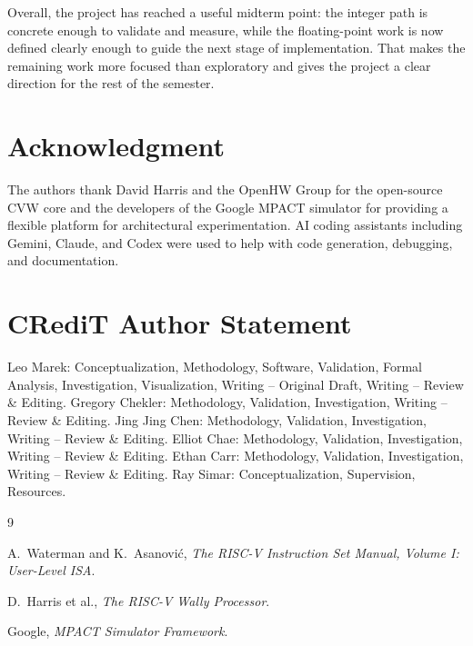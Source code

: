 \documentclass[conference,a4paper]{IEEEtran}
\begin{document}
Overall, the project has reached a useful midterm point: the integer path is concrete enough to validate and measure, while the floating-point work is now defined clearly enough to guide the next stage of implementation. That makes the remaining work more focused than exploratory and gives the project a clear direction for the rest of the semester.

\section*{Acknowledgment}

The authors thank David Harris and the OpenHW Group for the open-source CVW core and the developers of the Google MPACT simulator for providing a flexible platform for architectural experimentation. AI coding assistants including Gemini, Claude, and Codex were used to help with code generation, debugging, and documentation.

\section*{CRediT Author Statement}

Leo Marek: Conceptualization, Methodology, Software, Validation, Formal Analysis, Investigation, Visualization, Writing -- Original Draft, Writing -- Review \& Editing. Gregory Chekler: Methodology, Validation, Investigation, Writing -- Review \& Editing. Jing Jing Chen: Methodology, Validation, Investigation, Writing -- Review \& Editing. Elliot Chae: Methodology, Validation, Investigation, Writing -- Review \& Editing. Ethan Carr: Methodology, Validation, Investigation, Writing -- Review \& Editing. Ray Simar: Conceptualization, Supervision, Resources.

\begin{thebibliography}{9}

A.~Waterman and K.~Asanovi\'{c},
\emph{The RISC-V Instruction Set Manual, Volume I: User-Level ISA}.

D.~Harris et al.,
\emph{The RISC-V Wally Processor}.

Google,
\emph{MPACT Simulator Framework}.

\end{thebibliography}
\end{document}
